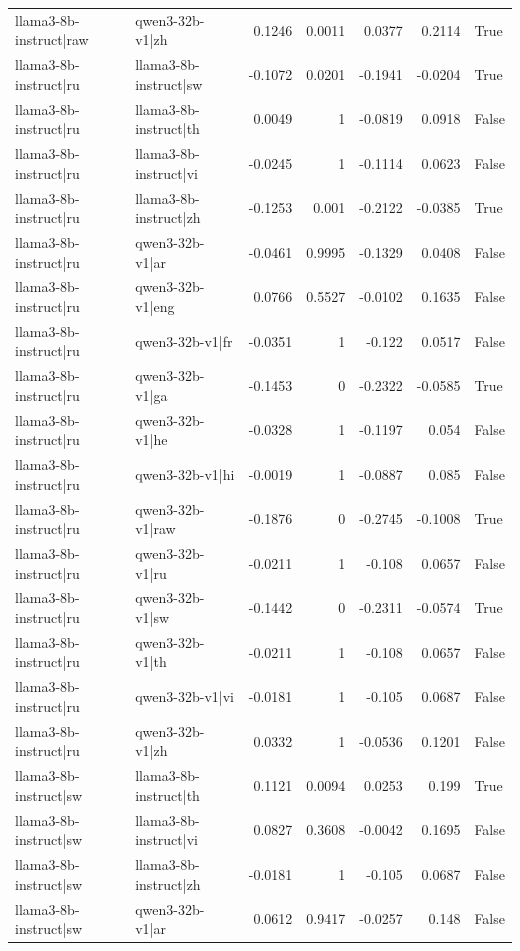 \begin{table}
\begin{tabular}{l l r r r r l}
llama3-8b-instruct|raw & qwen3-32b-v1|zh & 0.1246 & 0.0011 & 0.0377 & 0.2114 & True \\
llama3-8b-instruct|ru & llama3-8b-instruct|sw & -0.1072 & 0.0201 & -0.1941 & -0.0204 & True \\
llama3-8b-instruct|ru & llama3-8b-instruct|th & 0.0049 & 1 & -0.0819 & 0.0918 & False \\
llama3-8b-instruct|ru & llama3-8b-instruct|vi & -0.0245 & 1 & -0.1114 & 0.0623 & False \\
llama3-8b-instruct|ru & llama3-8b-instruct|zh & -0.1253 & 0.001 & -0.2122 & -0.0385 & True \\
llama3-8b-instruct|ru & qwen3-32b-v1|ar & -0.0461 & 0.9995 & -0.1329 & 0.0408 & False \\
llama3-8b-instruct|ru & qwen3-32b-v1|eng & 0.0766 & 0.5527 & -0.0102 & 0.1635 & False \\
llama3-8b-instruct|ru & qwen3-32b-v1|fr & -0.0351 & 1 & -0.122 & 0.0517 & False \\
llama3-8b-instruct|ru & qwen3-32b-v1|ga & -0.1453 & 0 & -0.2322 & -0.0585 & True \\
llama3-8b-instruct|ru & qwen3-32b-v1|he & -0.0328 & 1 & -0.1197 & 0.054 & False \\
llama3-8b-instruct|ru & qwen3-32b-v1|hi & -0.0019 & 1 & -0.0887 & 0.085 & False \\
llama3-8b-instruct|ru & qwen3-32b-v1|raw & -0.1876 & 0 & -0.2745 & -0.1008 & True \\
llama3-8b-instruct|ru & qwen3-32b-v1|ru & -0.0211 & 1 & -0.108 & 0.0657 & False \\
llama3-8b-instruct|ru & qwen3-32b-v1|sw & -0.1442 & 0 & -0.2311 & -0.0574 & True \\
llama3-8b-instruct|ru & qwen3-32b-v1|th & -0.0211 & 1 & -0.108 & 0.0657 & False \\
llama3-8b-instruct|ru & qwen3-32b-v1|vi & -0.0181 & 1 & -0.105 & 0.0687 & False \\
llama3-8b-instruct|ru & qwen3-32b-v1|zh & 0.0332 & 1 & -0.0536 & 0.1201 & False \\
llama3-8b-instruct|sw & llama3-8b-instruct|th & 0.1121 & 0.0094 & 0.0253 & 0.199 & True \\
llama3-8b-instruct|sw & llama3-8b-instruct|vi & 0.0827 & 0.3608 & -0.0042 & 0.1695 & False \\
llama3-8b-instruct|sw & llama3-8b-instruct|zh & -0.0181 & 1 & -0.105 & 0.0687 & False \\
llama3-8b-instruct|sw & qwen3-32b-v1|ar & 0.0612 & 0.9417 & -0.0257 & 0.148 & False \\

\end{tabular}
\end{table}
